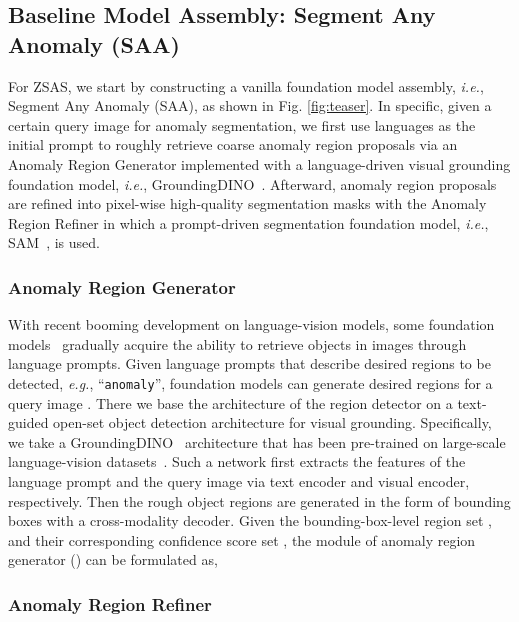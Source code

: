 \documentclass{article}
\begin{document}
\subsection{Baseline Model Assembly: Segment Any Anomaly (SAA) }

For ZSAS, we start by constructing a vanilla foundation model assembly, \textit{i.e.}, Segment Any Anomaly (SAA), as shown in Fig. \ref{fig:teaser}. In specific, given a certain query image for anomaly segmentation, we first use languages as the initial prompt to roughly retrieve coarse anomaly region proposals via an Anomaly Region Generator implemented with a language-driven visual grounding foundation model, \textit{i.e.}, GroundingDINO~\cite{liu2023grounding}. Afterward, anomaly region proposals are refined into pixel-wise high-quality segmentation masks with the Anomaly Region Refiner in which a prompt-driven segmentation foundation model, \textit{i.e.}, SAM~\cite{kirillov2023segment}, is used.


\subsubsection{Anomaly Region Generator}

With recent booming development on language-vision models, some foundation models~\cite{clipseg2022,liu2023grounding,zhong2022regionclip} gradually acquire the ability to retrieve objects in images through language prompts. Given language prompts  that describe desired regions to be detected, \textit{e.g.}, ``\verb|anomaly|'', foundation models can generate desired regions for  a query image . There we base the architecture of the region detector on a text-guided open-set object detection architecture for visual grounding. Specifically, we take a GroundingDINO~\cite{liu2023grounding} architecture that has been pre-trained on large-scale language-vision datasets~\cite{Laion400}. Such a network first extracts the features of the language prompt and the query image via text encoder and visual encoder, respectively. Then the rough object regions are generated in the form of bounding boxes with a cross-modality decoder. Given the bounding-box-level region set , and their corresponding confidence score set , the module of anomaly region generator () can be formulated as,



\subsubsection{Anomaly Region Refiner}
\end{document}
